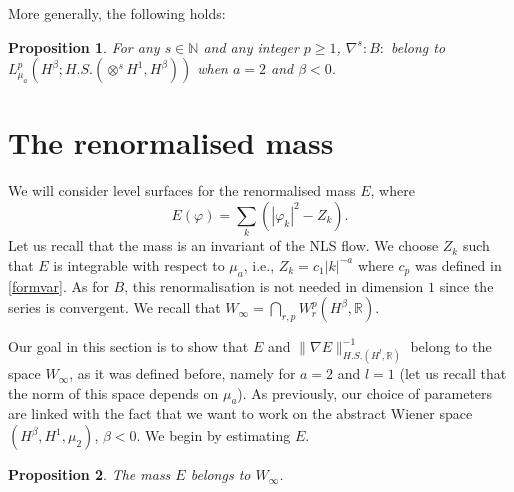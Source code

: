 \documentclass[11pt,leqno]{amsart}
\newtheorem{prop}{Proposition}[section]
\newcommand{\N}{\mathbb{N}}
\begin{document}
More generally, the following holds:

\begin{prop}  For any $ s\in \N$ and any integer $p\geq 1$, 
 $\nabla^s :B:$ belong to $L^p_{\mu_a} (H^\beta ; H.S. (\otimes^{s} H^1 , H^\beta))$    when $a=2$ and   $\beta<0$. 
\end{prop}





\section{The renormalised mass} \label{renormalized}
We will consider level surfaces for the  renormalised mass $E$, where
$$E(\varphi)=\sum_k ( |\varphi_k|^2 -Z_k).$$
Let us recall  that the mass is an invariant of the NLS flow. We choose $Z_k$ such that $E$ is integrable with respect to $\mu_a$, i.e.,  $Z_k = c_{1} |k|^{-a}$ where $c_p$ was defined
 in \eqref{formvar}. As for $B$, this renormalisation is not needed in dimension $1$ since the series  is convergent.
  We recall that $W_{\infty} = \bigcap_{r,p} W_{r}^p (H^\beta , \mathbb{R})$.

Our goal in this section is to show that $E$ and $\|\nabla E\|^{-1}_{H.S. ( H^l ,  \mathbb R) }$ 
belong to the space $W_\infty$,
 as it was defined before, namely for $a=2$ and $l=1$ (let us recall that the norm of this space depends on $\mu_a$). 
 As previously, our choice of parameters are linked with the fact that we want to work on the abstract Wiener space $(H^\beta ,H^1 ,\mu_2)$, $\beta<0$. We begin by estimating $E$.







\begin{prop} \label{Prop_EW}
The mass $E$ belongs to $W_{\infty}$.


\end{prop}
\end{document}
